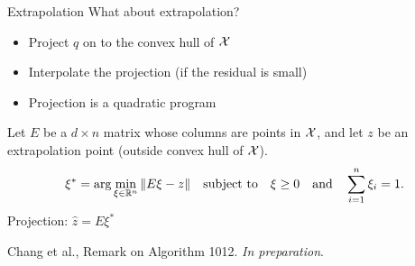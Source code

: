 \documentclass[aspectratio=169]{beamer}
\begin{document}
\begin{frame}{Extrapolation}
What about extrapolation?
\begin{itemize}
\item Project $q$ on to the convex hull of ${\cal X}$
\item Interpolate the projection (if the residual is small)
\item Projection is a quadratic program
\end{itemize}
Let $E$ be a $d\times n$ matrix whose columns are points in ${\cal X}$, and let
$z$ be an extrapolation point (outside convex hull of ${\cal X}$).
$$
\xi^* = \arg\min_{\xi\in\mathbb{R}^n} \|E\xi - z\| \quad\hbox{subject to}\quad
\xi \ge 0 \quad\hbox{and}\quad \sum_{i=1}^n \xi_i = 1.
$$
Projection: ${\hat z} = E\xi^*$

\vfill

{\tiny Chang et al.,
Remark on Algorithm 1012.
{\sl In preparation}.}
\end{frame}
\end{document}
